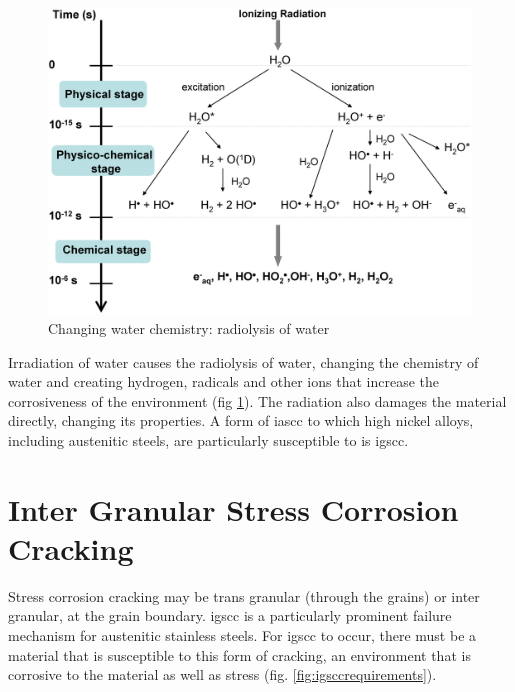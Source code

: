 \begin{figure}
  \begin{center}
    \includegraphics[width=.5\linewidth]{chapters/austenitic_steels_in_nuclear/images/water_radiolysis.png}
    \caption{Changing water chemistry: radiolysis of water\cite{waterradiolysis}}
    \label{fig:radiolysisofwater}
  \end{center}
\end{figure}

Irradiation of water causes the radiolysis of water, changing the chemistry of water and creating hydrogen, radicals and other ions that increase the corrosiveness of the environment (fig \ref{fig:radiolysisofwater}).  The radiation also damages the material directly, changing its properties.  A form of \acrshort{iascc} to which high nickel alloys, including austenitic steels, are particularly susceptible to is \acrlong{igscc}.



\section[IGSCC]{Inter Granular Stress Corrosion Cracking}

Stress corrosion cracking may be trans granular (through the grains) or inter granular, at the grain boundary.  \acrshort{igscc} is a particularly prominent failure mechanism for austenitic stainless steels.  For \acrshort{igscc} to occur, there must be a material that is susceptible to this form of cracking, an environment that is corrosive to the material as well as stress (fig. \ref{fig:igsccrequirements}).  

